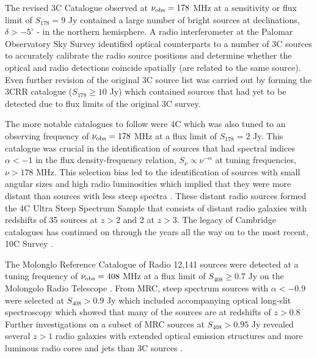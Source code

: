 \documentclass[10pt,a4paper]{article}
\begin{document}
The revised 3C Catalogue \citep[3CR][]{Leslie1961,Bennett1962} observed at $\nu_{\rm obs} = 178$ MHz at a sensitivity or flux limit of $S_{178} = 9$ Jy contained a large number of bright sources at declinations, $\delta > -5^{\circ}$ - in the northern hemisphere. A radio interferometer at the Palomar Observatory Sky Survey \citep[POSS][]{Veron1966} identified optical counterparts to a number of 3C sources to accurately calibrate the radio source positions and determine whether the optical and radio detections coincide spatially (are related to the same source). Even further revision of the original 3C source list was carried out by \citet{LaingRileyLongair1983} forming the 3CRR catalogue ($S_{178} \geq 10$ Jy) which contained sources that had yet to be detected due to flux limits of the original 3C survey. 

The more notable catalogues to follow were 4C \citep{PilkingtonScott1965} which was also tuned to an observing frequency of $\nu_{\rm obs} = 178$ MHz at a flux limit of $S_{178} = 2$ Jy. This catalogue was crucial in the identification of sources that had spectral indices $\alpha < -1$ in the flux density-frequency relation, $S_\nu \propto \nu^{-\alpha}$ at tuning frequencies, $\nu > 178$ MHz. This selection bias led to the identification of sources with small angular sizes and high radio luminosities which implied that they were more distant than sources with less steep spectra \citep{Tielens1979}. These distant radio sources formed the 4C Ultra Steep Spectrum Sample \citep[4C/USS][]{ChambersMiley1990} that consists of distant radio galaxies with redshifts of 35 sources at $z > 2$ and 2 at $z > 3.$ The legacy of Cambridge catalogues has continued on through the years all the way on to the most recent, 10C Survey \citep{AMIConsortium2011}. 

The Molonglo Reference Catalogue of Radio \citep[MRC][]{Large1981} 12,141 sources were detected at a tuning frequency of $\nu_{\rm obs} = 408$ MHz at a flux limit of $S_{408} \geq 0.7$ Jy on the Molongolo Radio Telescope \citep{Hunstead1972}. From MRC, steep spectrum sources with $\alpha < -0.9$ were selected at $S_{408} >0.9$ Jy which included accompanying optical long-slit spectroscopy which showed that many of the sources are at redshifts of $z > 0.8$ \citep{McCarthy1990} Further investigations on a subset of MRC sources at $S_{408} >0.95$ Jy revealed several $z > 1$ radio galaxies with extended optical emission structures and more luminous radio cores and jets than 3C sources \citep{McCarthy1991}. 
\end{document}
